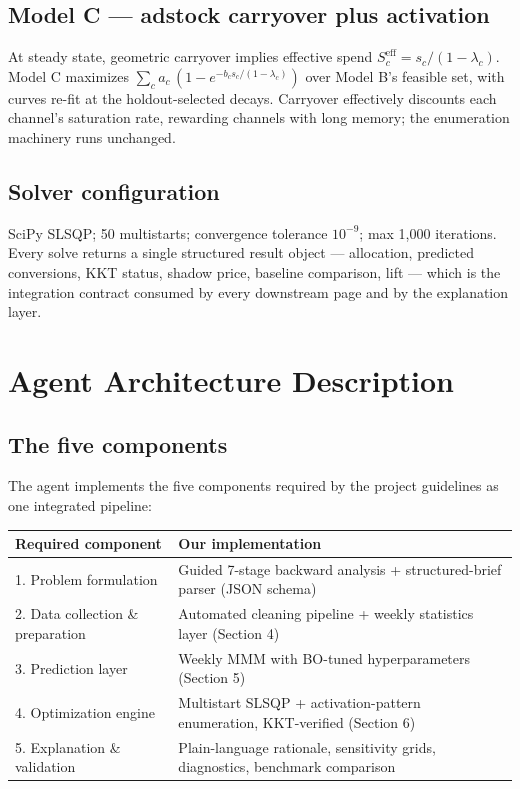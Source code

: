 \documentclass[11pt]{article}
\begin{document}
\subsection{Model C --- adstock carryover plus activation}

At steady state, geometric carryover implies effective spend $S^{\text{eff}}_c = s_c / (1 - \lambda_c)$. Model C maximizes $\sum_c a_c\,(1 - e^{-b_c s_c/(1-\lambda_c)})$ over Model B's feasible set, with curves re-fit at the holdout-selected decays. Carryover effectively discounts each channel's saturation rate, rewarding channels with long memory; the enumeration machinery runs unchanged.

\subsection{Solver configuration}

SciPy SLSQP; 50 multistarts; convergence tolerance $10^{-9}$; max 1{,}000 iterations. Every solve returns a single structured result object --- allocation, predicted conversions, KKT status, shadow price, baseline comparison, lift --- which is the integration contract consumed by every downstream page and by the explanation layer.

\section{Agent Architecture Description}

\subsection{The five components}

The agent implements the five components required by the project guidelines as one integrated pipeline:

\begin{center}
\begin{tabular}{ll}
\toprule
\textbf{Required component} & \textbf{Our implementation} \\
\midrule
1. Problem formulation & Guided 7-stage backward analysis + structured-brief parser (JSON schema) \\
2. Data collection \& preparation & Automated cleaning pipeline + weekly statistics layer (Section 4) \\
3. Prediction layer & Weekly MMM with BO-tuned hyperparameters (Section 5) \\
4. Optimization engine & Multistart SLSQP + activation-pattern enumeration, KKT-verified (Section 6) \\
5. Explanation \& validation & Plain-language rationale, sensitivity grids, diagnostics, benchmark comparison \\
\bottomrule
\end{tabular}
\end{center}
\end{document}
